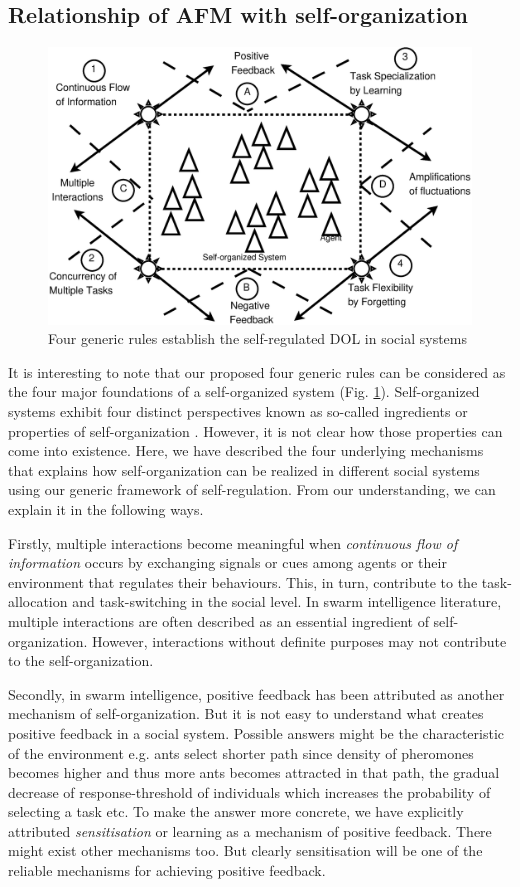 \documentclass[final,5p,times,twocolumn]{elsarticle}
\begin{document}
\subsection{Relationship of AFM with self-organization}
\label{afm:so}
\begin{figure}
\centering
\includegraphics[width=0.7\linewidth, angle=0]
{./images/self-org-2.eps}
\caption{\small Four generic rules establish the self-regulated DOL in social systems}
\label{fig:afm-rules} %
\end{figure}

It is interesting to note that our proposed four generic rules can be considered as  the four major foundations of a self-organized system (Fig.  \ref{fig:afm-rules}). Self-organized systems exhibit four distinct perspectives known as so-called ingredients or properties of self-organization \cite{Camazine+2001}. However, it is not clear how those properties can come into existence. Here, we have described the four underlying mechanisms that explains how self-organization can be realized in different social systems using our generic framework of self-regulation. From our understanding, we can explain it in the following ways.

Firstly, multiple interactions become meaningful when {\em continuous flow of information} occurs  by exchanging signals or cues among agents or their environment  that regulates their behaviours. This, in turn, contribute to the task-allocation  and task-switching in the social level.  In swarm intelligence literature, multiple interactions are often described as an essential ingredient of self-organization. However, interactions without definite purposes may not contribute to the self-organization.

Secondly, in swarm intelligence, positive feedback has been attributed as another mechanism of  self-organization. But it is not easy to understand what creates positive feedback in a social system. Possible answers might be the characteristic of the environment e.g. ants select shorter path since density of pheromones becomes higher and thus more ants becomes attracted in that path, the gradual decrease of response-threshold of individuals which increases the probability of selecting a task etc.  To make the answer more concrete, we have explicitly attributed {\em sensitisation} or learning as a mechanism of positive feedback. There might exist other mechanisms too. But clearly sensitisation will be one of the reliable mechanisms for achieving positive feedback.
\end{document}

